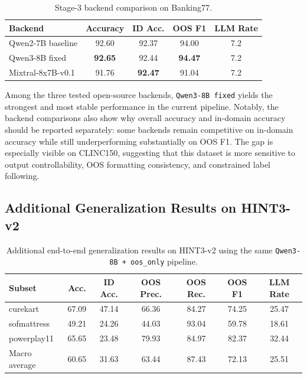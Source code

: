\documentclass[11pt]{article}
\begin{document}
\begin{table}[t]
\centering
\caption{Stage-3 backend comparison on Banking77.}
\label{tab:banking_llm_compare}
\begin{tabular}{lcccc}
\toprule
Backend & Accuracy & ID Acc. & OOS F1 & LLM Rate \\
\midrule
Qwen2-7B baseline & 92.60 & 92.37 & 94.00 & 7.2 \\
Qwen3-8B fixed & \textbf{92.65} & 92.44 & \textbf{94.47} & 7.2 \\
Mixtral-8x7B-v0.1 & 91.76 & \textbf{92.47} & 91.04 & 7.2 \\
\bottomrule
\end{tabular}
\end{table}

Among the three tested open-source backends, \texttt{Qwen3-8B fixed} yields the strongest and most stable performance in the current pipeline. Notably, the backend comparisons also show why overall accuracy and in-domain accuracy should be reported separately: some backends remain competitive on in-domain accuracy while still underperforming substantially on OOS F1. The gap is especially visible on CLINC150, suggesting that this dataset is more sensitive to output controllability, OOS formatting consistency, and constrained label following.

\subsection{Additional Generalization Results on HINT3-v2}
\begin{table}[t]
\centering
\caption{Additional end-to-end generalization results on HINT3-v2 using the same \texttt{Qwen3-8B + oos\_only} pipeline.}
\label{tab:hint3_results}
\begin{tabular}{lcccccc}
\toprule
Subset & Acc. & ID Acc. & OOS Prec. & OOS Rec. & OOS F1 & LLM Rate \\
\midrule
curekart & 67.09 & 47.14 & 66.36 & 84.27 & 74.25 & 25.47 \\
sofmattress & 49.21 & 24.26 & 44.03 & 93.04 & 59.78 & 18.61 \\
powerplay11 & 65.65 & 23.48 & 79.93 & 84.97 & 82.37 & 32.44 \\
Macro average & 60.65 & 31.63 & 63.44 & 87.43 & 72.13 & 25.51 \\
\bottomrule
\end{tabular}
\end{table}
\end{document}
